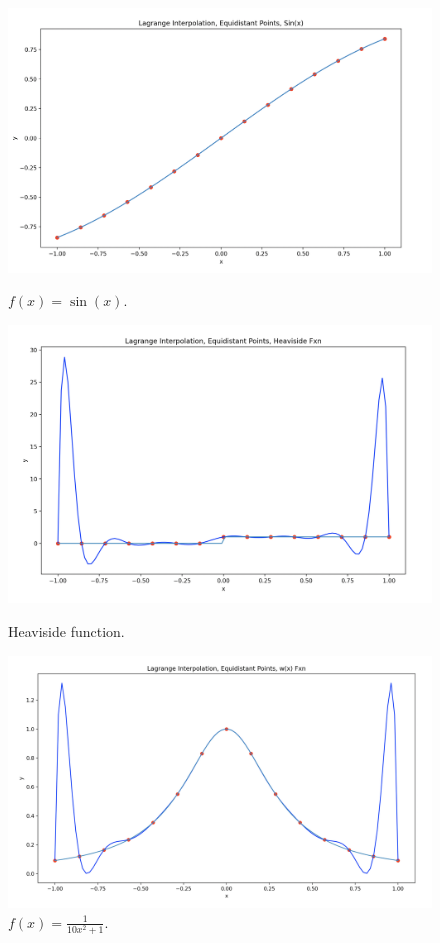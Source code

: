 \documentclass[11pt]{article}
\theoremstyle{definition}
\theoremstyle{theorem}
\begin{document}
\begin{figure}[H]
  \includegraphics[width=\linewidth]{plots/1a.png}
  \caption{\( f(x) = \sin(x). \)}\label{fig:1a}
\endminipage\hfill
{}
  \includegraphics[width=\linewidth]{plots/1b.png}
  \caption{Heaviside function.}\label{fig:1b}
\endminipage\hfill
{}%
  \includegraphics[width=\linewidth]{plots/1c.png}
  \caption{\(f(x) = \frac{1}{10x^2 +1}. \)}\label{fig:1c}
\endminipage
\end{figure}
\end{document}
